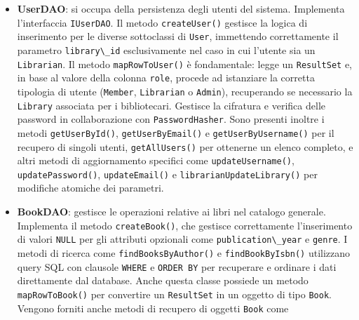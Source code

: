 \documentclass[
  italian,
  paper=a4,
  ,captions=tableheading
]{scrbook}
\newcommand{\passthrough}[1]{#1}
\begin{document}
\begin{itemize}
\item
  \textbf{UserDAO}: si occupa della persistenza degli utenti del
  sistema. Implementa l'interfaccia \passthrough{\lstinline!IUserDAO!}.
  Il metodo \passthrough{\lstinline!createUser()!} gestisce la logica di
  inserimento per le diverse sottoclassi di
  \passthrough{\lstinline!User!}, immettendo correttamente il parametro
  \passthrough{\lstinline!library\_id!} esclusivamente nel caso in cui
  l'utente sia un \passthrough{\lstinline!Librarian!}. Il metodo
  \passthrough{\lstinline!mapRowToUser()!} è fondamentale: legge un
  \passthrough{\lstinline!ResultSet!} e, in base al valore della colonna
  \passthrough{\lstinline!role!}, procede ad istanziare la corretta
  tipologia di utente (\passthrough{\lstinline!Member!},
  \passthrough{\lstinline!Librarian!} o
  \passthrough{\lstinline!Admin!}), recuperando se necessario la
  \passthrough{\lstinline!Library!} associata per i bibliotecari.
  Gestisce la cifratura e verifica delle password in collaborazione con
  \passthrough{\lstinline!PasswordHasher!}. Sono presenti inoltre i
  metodi \passthrough{\lstinline!getUserById()!},
  \passthrough{\lstinline!getUserByEmail()!} e
  \passthrough{\lstinline!getUserByUsername()!} per il recupero di
  singoli utenti, \passthrough{\lstinline!getAllUsers()!} per ottenerne
  un elenco completo, e altri metodi di aggiornamento specifici come
  \passthrough{\lstinline!updateUsername()!},
  \passthrough{\lstinline!updatePassword()!},
  \passthrough{\lstinline!updateEmail()!} e
  \passthrough{\lstinline!librarianUpdateLibrary()!} per modifiche
  atomiche dei parametri.
\item
  \textbf{BookDAO}: gestisce le operazioni relative ai libri nel
  catalogo generale. Implementa il metodo
  \passthrough{\lstinline!createBook()!}, che gestisce correttamente
  l'inserimento di valori \passthrough{\lstinline!NULL!} per gli
  attributi opzionali come \passthrough{\lstinline!publication\_year!} e
  \passthrough{\lstinline!genre!}. I metodi di ricerca come
  \passthrough{\lstinline!findBooksByAuthor()!} e
  \passthrough{\lstinline!findBookByIsbn()!} utilizzano query SQL con
  clausole \passthrough{\lstinline!WHERE!} e
  \passthrough{\lstinline!ORDER BY!} per recuperare e ordinare i dati
  direttamente dal database. Anche questa classe possiede un metodo
  \passthrough{\lstinline!mapRowToBook()!} per convertire un
  \passthrough{\lstinline!ResultSet!} in un oggetto di tipo
  \passthrough{\lstinline!Book!}. Vengono forniti anche metodi di
  recupero di oggetti \passthrough{\lstinline!Book!} come

\end{itemize}
\end{document}
